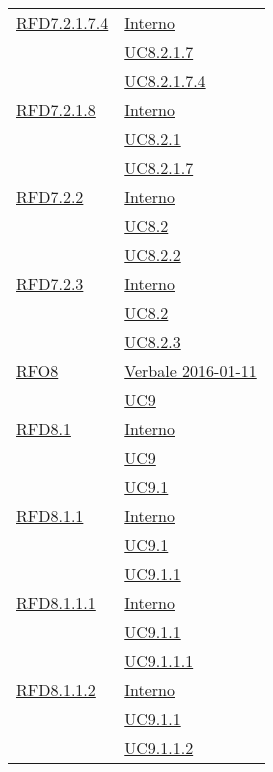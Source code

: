 \begin{longtable}{|>{\centering}m{5cm}|m{5cm}<{\centering}|}
\hyperlink{RFD7.2.1.7.4}{RFD7.2.1.7.4} & \hyperlink{Interno}{Interno}\\
& \hyperref[UC8.2.1.7]{UC8.2.1.7}\\
& \hyperref[UC8.2.1.7.4]{UC8.2.1.7.4}\\ \hline

\hyperlink{RFD7.2.1.8}{RFD7.2.1.8} & \hyperlink{Interno}{Interno}\\
& \hyperref[UC8.2.1]{UC8.2.1}\\
& \hyperref[UC8.2.1.7]{UC8.2.1.7}\\ \hline

\hyperlink{RFD7.2.2}{RFD7.2.2} & \hyperlink{Interno}{Interno}\\
& \hyperref[UC8.2]{UC8.2}\\
& \hyperref[UC8.2.2]{UC8.2.2}\\ \hline

\hyperlink{RFD7.2.3}{RFD7.2.3} & \hyperlink{Interno}{Interno}\\
& \hyperref[UC8.2]{UC8.2}\\
& \hyperref[UC8.2.3]{UC8.2.3}\\ \hline

\hyperlink{RFO8}{RFO8} & \hyperlink{Verbale 2016-01-11}{Verbale 2016-01-11}\\
& \hyperref[UC9]{UC9}\\ \hline

\hyperlink{RFD8.1}{RFD8.1} & \hyperlink{Interno}{Interno}\\
& \hyperref[UC9]{UC9}\\
& \hyperref[UC9.1]{UC9.1}\\ \hline

\hyperlink{RFD8.1.1}{RFD8.1.1} & \hyperlink{Interno}{Interno}\\
& \hyperref[UC9.1]{UC9.1}\\
& \hyperref[UC9.1.1]{UC9.1.1}\\ \hline

\hyperlink{RFD8.1.1.1}{RFD8.1.1.1} & \hyperlink{Interno}{Interno}\\
& \hyperref[UC9.1.1]{UC9.1.1}\\
& \hyperref[UC9.1.1.1]{UC9.1.1.1}\\ \hline

\hyperlink{RFD8.1.1.2}{RFD8.1.1.2} & \hyperlink{Interno}{Interno}\\
& \hyperref[UC9.1.1]{UC9.1.1}\\
& \hyperref[UC9.1.1.2]{UC9.1.1.2}\\ \hline


\end{longtable}
